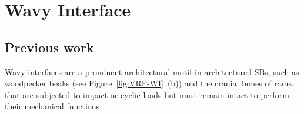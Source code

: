 \documentclass[10pt,letterpaper]{article}
\begin{document}
\section{Wavy Interface}
\subsection{Previous work}
Wavy interfaces are a prominent architectural motif in architectured SBs, such as woodpecker beaks (see Figure~\ref{fig:VRF-WI}~(b)) and the cranial bones of rams, that are subjected to impact or cyclic loads but must remain intact to perform their mechanical functions \cite{lee2014hierarchical, jaslow1990mechanical}.


\end{document}

